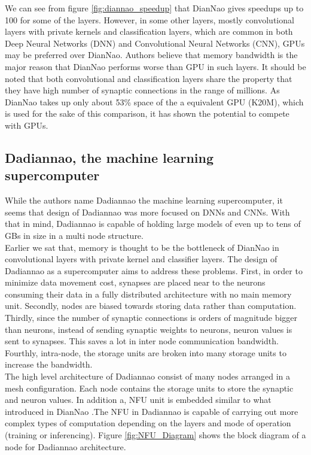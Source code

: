 \documentclass[runningheads,a4paper]{llncs}
\begin{document}
{We can see from figure \ref{fig:diannao_speedup} that DianNao gives speedups up to 100 for some of the layers. However, in some other layers, mostly convolutional layers with private kernels and classification layers, which are common in both Deep Neural Networks (DNN) and Convolutional Neural Networks (CNN), GPUs may be preferred over DianNao. Authors believe that memory bandwidth is the major reason that DianNao performs worse than GPU in such layers. It should be noted that both convolutional and classification layers share the property that they have high number of synaptic connections in the range of millions. As DianNao takes up only about 53\% space of the a equivalent GPU (K20M), which is used for the sake of this comparison, it has shown the potential to compete with GPUs.
\subsection*{Dadiannao, the machine learning supercomputer}

While the authors name Dadiannao the machine learning supercomputer, it seems that design of Dadiannao was more focused on DNNs and CNNs. With that in mind, Dadiannao is capable of holding large models of even up to tens of GBs in size in a multi node structure.\\

Earlier we sat that, memory is thought to be the bottleneck of DianNao in convolutional layers with private kernel and classifier layers. The design of Dadiannao as a supercomputer aims to address these problems. First, in order to minimize data movement cost, synapses are placed near to the neurons consuming their data in a fully distributed architecture with no main memory unit. Secondly, nodes are biased towards storing data rather than computation. Thirdly, since the number of synaptic connections is orders of magnitude bigger than neurons,  instead of sending synaptic weights to neurons, neuron values is sent to synapses. This saves a lot in inter node communication bandwidth. Fourthly, intra-node, the storage units are broken into many storage units to increase the bandwidth.\\

The high level architecture of Dadiannao consist of many nodes arranged in a mesh configuration. Each node contains the storage units to store the synaptic and neuron values. In addition a, NFU unit is embedded similar to what introduced in DianNao \cite{chen2014diannao}.The NFU in Dadiannao is capable of carrying out more complex types of computation depending on the layers and mode of operation (training or inferencing). Figure \ref{fig:NFU_Diagram} shows the block diagram of a node for Dadiannao architecture. \\

}
\end{document}
